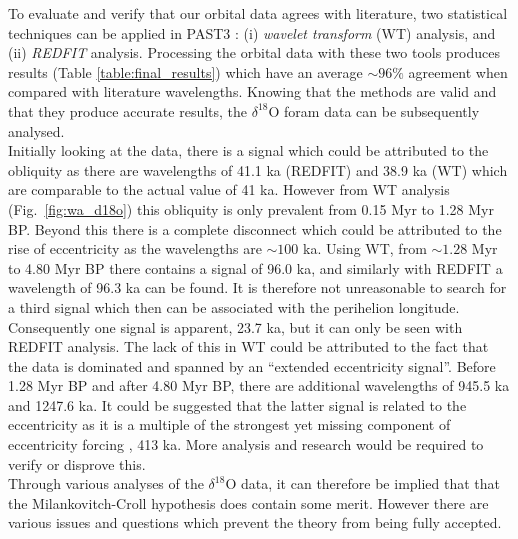\documentclass[12pt, onecolumn]{revtex4}    %
\begin{document}
To evaluate and verify that our orbital data agrees with literature, two statistical techniques can be applied in PAST3 \cite{past3}: (i) \textit{wavelet transform} (WT) analysis, and (ii) \textit{REDFIT} analysis. Processing the orbital data with these two tools produces results (Table \ref{table:final_results}) which have an average $\sim 96 \%$ agreement when compared with literature wavelengths. Knowing that the methods are valid and that they produce accurate results, the $\delta^{18}$O foram data can be subsequently analysed.  \\

Initially looking at the data, there is a signal which could be attributed to the obliquity as there are wavelengths of 41.1 ka (REDFIT) and 38.9 ka (WT) which are comparable to the actual value of 41 ka. However from WT analysis (Fig.~\ref{fig:wa_d18o}) this obliquity is only prevalent from 0.15 Myr to 1.28 Myr BP. Beyond this there is a complete disconnect which could be attributed to the rise of eccentricity as the wavelengths are $\sim 100$ ka. Using WT, from $\sim 1.28$ Myr to 4.80 Myr BP there contains a signal of 96.0 ka, and similarly with REDFIT a wavelength of 96.3 ka can be found.  It is therefore not unreasonable to search for a third signal which then can be associated with the perihelion longitude. Consequently one signal is apparent, 23.7 ka, but it can only be seen with REDFIT analysis. The lack of this in WT could be attributed to the fact that the data is dominated and spanned by an ``extended eccentricity signal''. Before 1.28 Myr BP and after 4.80 Myr BP, there are additional wavelengths of 945.5 ka and 1247.6 ka. It could be suggested that the latter signal is related to the eccentricity as it is a multiple of the strongest yet missing component of eccentricity forcing \cite{berger_climate}, 413 ka. More analysis and research would be required to verify or disprove this. \\

Through various analyses of the $\delta^{18}$O data, it can therefore be implied that that the Milankovitch-Croll hypothesis does contain some merit. However there are various issues and questions which prevent the theory from being fully accepted. \\
\end{document}
